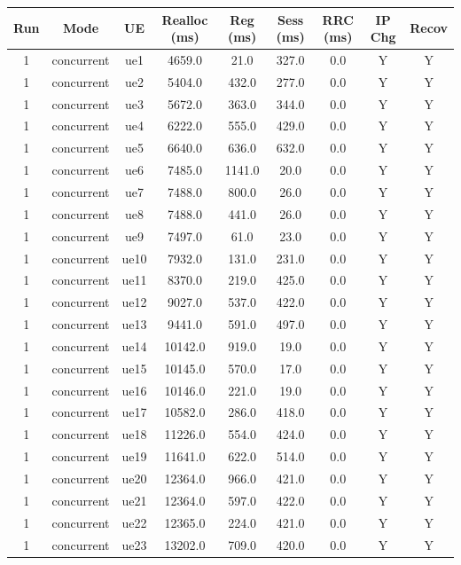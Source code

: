 \begin{table}[ht]
\centering
\begin{tabular}{|c|c|c|c|c|c|c|c|c|}
\hline
Run & Mode & UE & Realloc (ms) & Reg (ms) & Sess (ms) & RRC (ms) & IP Chg & Recov \\
\hline
1 & concurrent & ue1 & 4659.0 & 21.0 & 327.0 & 0.0 & Y & Y \\
1 & concurrent & ue2 & 5404.0 & 432.0 & 277.0 & 0.0 & Y & Y \\
1 & concurrent & ue3 & 5672.0 & 363.0 & 344.0 & 0.0 & Y & Y \\
1 & concurrent & ue4 & 6222.0 & 555.0 & 429.0 & 0.0 & Y & Y \\
1 & concurrent & ue5 & 6640.0 & 636.0 & 632.0 & 0.0 & Y & Y \\
1 & concurrent & ue6 & 7485.0 & 1141.0 & 20.0 & 0.0 & Y & Y \\
1 & concurrent & ue7 & 7488.0 & 800.0 & 26.0 & 0.0 & Y & Y \\
1 & concurrent & ue8 & 7488.0 & 441.0 & 26.0 & 0.0 & Y & Y \\
1 & concurrent & ue9 & 7497.0 & 61.0 & 23.0 & 0.0 & Y & Y \\
1 & concurrent & ue10 & 7932.0 & 131.0 & 231.0 & 0.0 & Y & Y \\
1 & concurrent & ue11 & 8370.0 & 219.0 & 425.0 & 0.0 & Y & Y \\
1 & concurrent & ue12 & 9027.0 & 537.0 & 422.0 & 0.0 & Y & Y \\
1 & concurrent & ue13 & 9441.0 & 591.0 & 497.0 & 0.0 & Y & Y \\
1 & concurrent & ue14 & 10142.0 & 919.0 & 19.0 & 0.0 & Y & Y \\
1 & concurrent & ue15 & 10145.0 & 570.0 & 17.0 & 0.0 & Y & Y \\
1 & concurrent & ue16 & 10146.0 & 221.0 & 19.0 & 0.0 & Y & Y \\
1 & concurrent & ue17 & 10582.0 & 286.0 & 418.0 & 0.0 & Y & Y \\
1 & concurrent & ue18 & 11226.0 & 554.0 & 424.0 & 0.0 & Y & Y \\
1 & concurrent & ue19 & 11641.0 & 622.0 & 514.0 & 0.0 & Y & Y \\
1 & concurrent & ue20 & 12364.0 & 966.0 & 421.0 & 0.0 & Y & Y \\
1 & concurrent & ue21 & 12364.0 & 597.0 & 422.0 & 0.0 & Y & Y \\
1 & concurrent & ue22 & 12365.0 & 224.0 & 421.0 & 0.0 & Y & Y \\
1 & concurrent & ue23 & 13202.0 & 709.0 & 420.0 & 0.0 & Y & Y \\

\end{tabular}
\end{table}
